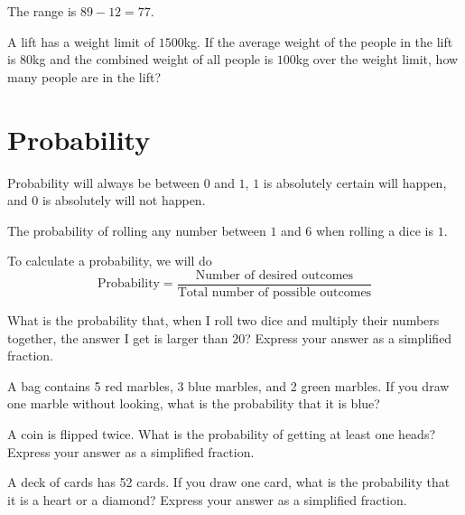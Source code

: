 \documentclass{article}
\theoremstyle{mytheoremstyle}
\theoremstyle{mytheoremstyle}
\theoremstyle{myproblemstyle}
\theoremstyle{myproblemstyle}
\begin{document}
    The range is $89 - 12 = 77$.

    \begin{problem}
        A lift has a weight limit of $1500$kg. If the average weight of the people in the lift is $80$kg and the combined weight of all people is $100$kg over the weight limit, how many people are in the lift?
    \end{problem}



    \section{Probability}
    
    Probability will always be between $0$ and $1$, $1$ is absolutely certain will happen, and $0$ is absolutely will not happen.

    \begin{example}
        The probability of rolling any number between $1$ and $6$ when rolling a dice is $1$.
    \end{example}

    To calculate a probability, we will do 
    \[\text{Probability} = \frac{\text{Number of desired outcomes}}{\text{Total number of possible outcomes}}\]

    \begin{problem}
        What is the probability that, when I roll two dice and multiply their numbers together, the answer I get is larger than $20$? Express your answer as a simplified fraction.
    \end{problem}

    \begin{problem}
        A bag contains 5 red marbles, 3 blue marbles, and 2 green marbles. If you draw one marble without looking, what is the probability that it is blue?
    \end{problem}

    \begin{problem}
        A coin is flipped twice. What is the probability of getting at least one heads? Express your answer as a simplified fraction.
    \end{problem}

    \begin{problem}
        A deck of cards has 52 cards. If you draw one card, what is the probability that it is a heart or a diamond? Express your answer as a simplified fraction.
    \end{problem}
\end{document}
